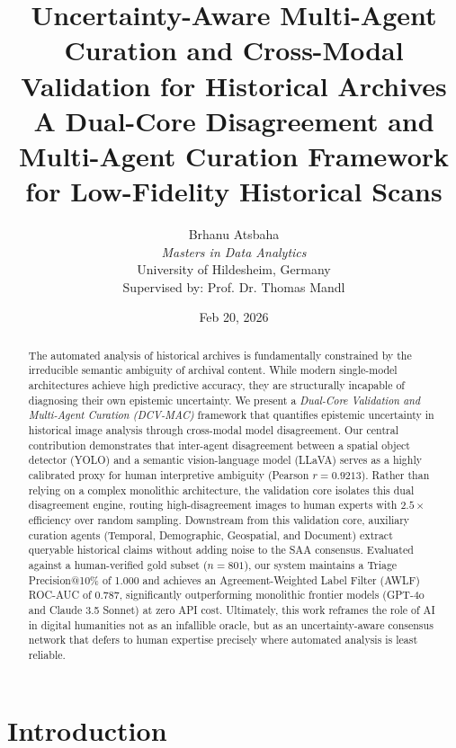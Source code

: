 \documentclass[12pt,onecolumn,a4paper]{IEEEtran}
\title{\Huge \textbf{Uncertainty-Aware Multi-Agent Curation and Cross-Modal Validation for Historical Archives} \\ [0.5cm]
\Large \textbf{A Dual-Core Disagreement and Multi-Agent Curation Framework for Low-Fidelity Historical Scans}}
\author{\large Brhanu Atsbaha \\ 
\textit{Masters in Data Analytics} \\ 
University of Hildesheim, Germany \\
Supervised by: Prof. Dr. Thomas Mandl \\
}
\date{Feb 20, 2026}
\begin{document}
\maketitle

\begin{abstract}
The automated analysis of historical archives is fundamentally constrained by the irreducible semantic ambiguity of archival content. While modern single-model architectures achieve high predictive accuracy, they are structurally incapable of diagnosing their own epistemic uncertainty. We present a \textit{Dual-Core Validation and Multi-Agent Curation (DCV-MAC)} framework that quantifies epistemic uncertainty in historical image analysis through cross-modal model disagreement. Our central contribution demonstrates that inter-agent disagreement between a spatial object detector (YOLO) and a semantic vision-language model (LLaVA) serves as a highly calibrated proxy for human interpretive ambiguity (Pearson $r = 0.9213$). Rather than relying on a complex monolithic architecture, the validation core isolates this dual disagreement engine, routing high-disagreement images to human experts with $2.5\times$ efficiency over random sampling. Downstream from this validation core, auxiliary curation agents (Temporal, Demographic, Geospatial, and Document) extract queryable historical claims without adding noise to the SAA consensus. Evaluated against a human-verified gold subset ($n=801$), our system maintains a Triage Precision@10\% of 1.000 and achieves an Agreement-Weighted Label Filter (AWLF) ROC-AUC of 0.787, significantly outperforming monolithic frontier models (GPT-4o and Claude 3.5 Sonnet) at zero API cost. Ultimately, this work reframes the role of AI in digital humanities not as an infallible oracle, but as an uncertainty-aware consensus network that defers to human expertise precisely where automated analysis is least reliable.
\end{abstract}

\newpage
\tableofcontents
\newpage
\listoffigures
\newpage
\listoftables
\newpage

\section{Introduction}
\label{sec:intro}
\end{document}
